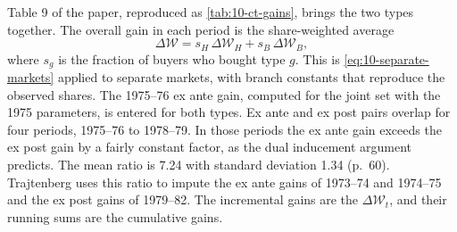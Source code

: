 Table 9 of the paper, reproduced as \cref{tab:10-ct-gains}, brings the two types together. The overall gain in each
period is the share-weighted average
\begin{equation}\label{eq:10-traj-overall}
\Delta\mathcal{W} = s_H\,\Delta\mathcal{W}_H + s_B\,\Delta\mathcal{W}_B,
\end{equation}
where $s_g$ is the fraction of buyers who bought type $g$. This is \eqref{eq:10-separate-markets} applied to
separate markets, with branch constants that reproduce the observed shares. The 1975--76 ex ante gain, computed for the joint set with the 1975 parameters, is entered for both
types. Ex ante and ex post pairs overlap for four periods, 1975--76 to 1978--79. In those periods the ex ante gain
exceeds the ex post gain by a fairly constant factor, as the dual inducement argument predicts. The mean ratio is
7.24 with standard deviation 1.34 (p.~60). Trajtenberg uses this ratio to impute the ex ante gains of 1973--74 and
1974--75 and the ex post gains of 1979--82. The incremental gains are the $\Delta\mathcal{W}_t$, and their running
sums are the cumulative gains.

